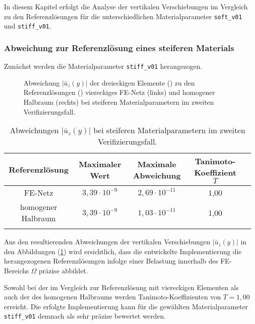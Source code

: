 In diesem Kapitel erfolgt die Analyse der vertikalen Verschiebungen im Vergleich zu den Referenzlösungen für die unterschiedlichen Materialparameter \texttt{soft\_v01} und \texttt{stiff\_v01}.


\subsubsection{Abweichung zur Referenzlösung eines steiferen Materials}
Zunächst werden die Materialparameter \texttt{stiff\_v01} herangezogen.
\begin{figure}[H]
	\centering
	\begin{subfigure}{0.49\linewidth}
		\centering
		
	\end{subfigure}\hfill
	\begin{subfigure}{0.49\linewidth}
		\centering
		
	\end{subfigure}
	\caption{Abweichung $|\bar{u}_z(y)|$ der dreieckigen Elemente (\legThree) zu den Referenzlösungen (\legFour) viereckiges FE-Netz (links) und homogener Halbraum (rechts) bei steiferen Materialparametern im zweiten Verifizierungsfall.}
	\label{fig:c2}
\end{figure}
\begin{table}[htb]
	\centering
	\normalsize
	{\renewcommand{\arraystretch}{1.15}
		\begin{tabular}{ccccc}
			\firsthline
			Referenzlösung & Maximaler Wert & Maximale Abweichung & Tanimoto-Koeffizient $T$ \\\hline
			FE-Netz & $ 3,39\cdot10^{-9}$ & $2,69\cdot10^{-11}$ & 1,00 \\
			homogener Halbraum & $3,39\cdot10^{-9}$ & $1,03\cdot10^{-11}$ & 1,00 \\\lasthline
	\end{tabular}}
	\caption{Abweichungen $|\bar{u}_z(y)|$ bei steiferen Materialparametern im zweiten Verifizierungsfall.}
	\label{tab:Fehlermessung_c2}
\end{table}
Aus den resultierenden Abweichungen der vertikalen Verschiebungen $|\bar{u}_z(y)|$ in den Abbildungen (\ref{fig:c2}) wird ersichtlich, dass die entwickelte Implementierung die herangezogenen Referenzlösungen infolge einer Belastung innerhalb des FE-Bereichs $\Omega$ präzise abbildet.

Sowohl bei der im Vergleich zur Referenzlösung mit viereckigen Elementen als auch der des homogenen Halbraums werden Tanimoto-Koeffizienten von $T = 1,00$ erreicht. Die erfolgte Implementierung kann für die gewählten Materialparameter \texttt{stiff\_v01} demnach als sehr präzise bewertet werden.


